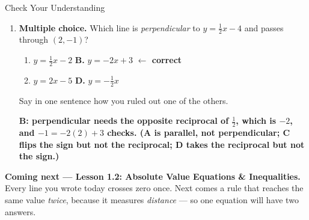 \documentclass[12pt]{article}
\newcommand{\answerspace}[2]{\par\nopagebreak\noindent\begin{minipage}[t][#1][t]{\linewidth}%
  \color{keyred}\bfseries #2\end{minipage}\par}
\begin{document}
\begin{notesbox}{Check Your Understanding }
\begin{enumerate}[leftmargin=1.7em, itemsep=3pt]
  \item \textbf{Multiple choice.} Which line is \emph{perpendicular} to $y = \tfrac12 x - 4$ and
        passes through $(2,-1)$?
    \begin{enumerate}[label=\Alph*., leftmargin=2.2em, itemsep=1pt]
      \item[\textbf{A.}] $y = \tfrac12 x - 2$ \hfill \textbf{B.} $y = -2x + 3$ \textcolor{keyred}{\textbf{$\leftarrow$ correct}}
      \item[\textbf{C.}] $y = 2x - 5$ \hfill \textbf{D.} $y = -\tfrac12 x$
    \end{enumerate}
    Say in one sentence how you ruled out one of the others.
    \answerspace{1.2cm}{B: perpendicular needs the opposite reciprocal of $\tfrac12$, which is $-2$, and $-1 = -2(2)+3$ checks. (A is parallel, not perpendicular; C flips the sign but not the reciprocal; D takes the reciprocal but not the sign.)}
\end{enumerate}
\end{notesbox}

\boxguard[5]
\begin{spiralbox}
\textbf{Coming next --- Lesson 1.2: Absolute Value Equations \& Inequalities.} Every line you wrote
today crosses zero once. Next comes a rule that reaches the same value \emph{twice}, because it
measures \emph{distance} --- so one equation will have two answers.
\end{spiralbox}
\end{document}
